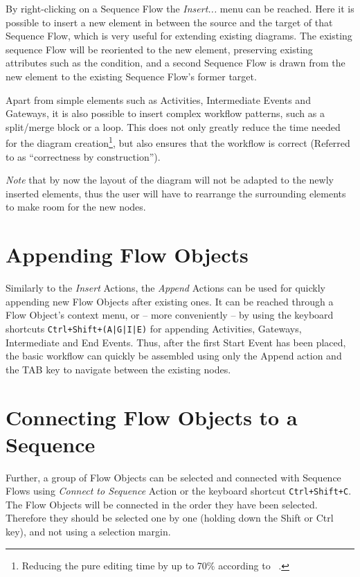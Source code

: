 By right-clicking on a Sequence Flow the \emph{Insert...} menu can be reached.
Here it is possible to insert a new element in between the source and the target
of that Sequence Flow, which is very useful for extending existing diagrams.  The
existing sequence Flow will be reoriented to the new element, preserving existing
attributes such as the condition, and a second Sequence Flow is drawn from the
new element to the existing Sequence Flow's former target.

Apart from simple elements such as Activities, Intermediate Events and Gateways,
it is also possible to insert complex workflow patterns, such as a split/merge
block or a loop.  This does not only greatly reduce the time needed for the
diagram creation\footnote{Reducing the pure editing time by up to 70\% according
to ~\cite{gschwind2008applying}.}, but also ensures that the workflow is correct
(Referred to as ``correctness by construction'').

\emph{Note} that by now the layout of the diagram will not be adapted to the newly
inserted elements, thus the user will have to rearrange the surrounding elements
to make room for the new nodes.

\section{Appending Flow Objects}
Similarly to the \emph{Insert} Actions, the \emph{Append} Actions can be used for
quickly appending new Flow Objects after existing ones.  It can be reached through
a Flow Object's context menu, or -- more conveniently -- by using the keyboard
shortcuts \texttt{Ctrl+Shift+(A|G|I|E)} for appending Activities, Gateways,
Intermediate and End Events.  Thus, after the first Start Event has been placed,
the basic workflow can quickly be assembled using only the Append action and the
TAB key to navigate between the existing nodes.

\section{Connecting Flow Objects to a Sequence}
Further, a group of Flow Objects can be selected and connected with Sequence Flows
using \emph{Connect to Sequence} Action or the keyboard shortcut \texttt{Ctrl+Shift+C}.
The Flow Objects will be connected in the order they have been selected.  Therefore
they should be selected one by one (holding down the Shift or Ctrl key), and not
using a selection margin.


